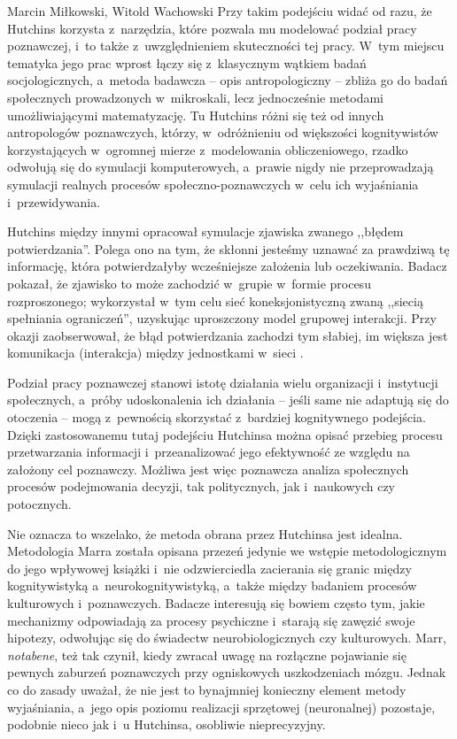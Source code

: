 \begin{artplenv2auth}{Marcin Miłkowski, Witold Wachowski}
Przy takim podejściu widać od razu, że Hutchins korzysta z~narzędzia, które pozwala mu modelować podział pracy poznawczej, i~to także z~uwzględnieniem skuteczności tej pracy. W~tym miejscu tematyka jego prac wprost łączy się z~klasycznym wątkiem badań socjologicznych, a~metoda badawcza -- opis antropologiczny -- zbliża go do badań społecznych prowadzonych w~mikroskali, lecz jednocześnie metodami umożliwiającymi matematyzację. Tu Hutchins różni się też od innych antropologów poznawczych, którzy, w~odróżnieniu od większości kognitywistów korzystających w~ogromnej mierze z~modelowania obliczeniowego, rzadko odwołują się do symulacji komputerowych, a~prawie nigdy nie przeprowadzają symulacji realnych procesów społeczno-poznawczych w~celu ich wyjaśniania i~przewidywania.

Hutchins między innymi opracował symulacje zjawiska zwanego ,,błędem potwierdzania''. Polega ono na tym, że skłonni jesteśmy uznawać za prawdziwą tę informację, która potwierdzałyby wcześniejsze założenia lub oczekiwania. Badacz pokazał, że zjawisko to może zachodzić w~grupie w~formie procesu rozproszonego; wykorzystał w~tym celu sieć koneksjonistyczną zwaną ,,siecią spełniania ograniczeń'', uzyskując uproszczony model grupowej interakcji. Przy okazji zaobserwował, że błąd potwierdzania zachodzi tym słabiej, im większa jest komunikacja (interakcja) między jednostkami w~sieci
\parencite[][s.~239–255]{hutchins_cognition_1995}.%


Podział pracy poznawczej stanowi istotę działania wielu organizacji i~instytucji społecznych, a~próby udoskonalenia ich działania -- jeśli same nie adaptują się do otoczenia -- mogą z~pewnością skorzystać z~bardziej kognitywnego podejścia. Dzięki zastosowanemu tutaj podejściu Hutchinsa można opisać przebieg procesu przetwarzania informacji i~przeanalizować jego efektywność ze względu na założony cel poznawczy. Możliwa jest więc poznawcza analiza społecznych procesów podejmowania decyzji, tak politycznych, jak i~naukowych czy potocznych.

Nie oznacza to wszelako, że metoda obrana przez Hutchinsa jest idealna. Metodologia Marra została opisana przezeń jedynie we wstępie metodologicznym do jego wpływowej książki i~nie odzwierciedla zacierania się granic między kognitywistyką a~neurokognitywistyką, a~także między badaniem procesów kulturowych i~poznawczych. Badacze interesują się bowiem często tym, jakie mechanizmy odpowiadają za procesy psychiczne i~starają się zawęzić swoje hipotezy, odwołując się do świadectw neurobiologicznych czy kulturowych. Marr, \textit{notabene}, też tak czynił, kiedy zwracał uwagę na rozłączne pojawianie się pewnych zaburzeń poznawczych przy ogniskowych uszkodzeniach mózgu. Jednak co do zasady uważał, że nie jest to bynajmniej konieczny element metody wyjaśniania, a~jego opis poziomu realizacji sprzętowej (neuronalnej) pozostaje, podobnie nieco jak i~u Hutchinsa, osobliwie nieprecyzyjny.


\end{artplenv2auth}
